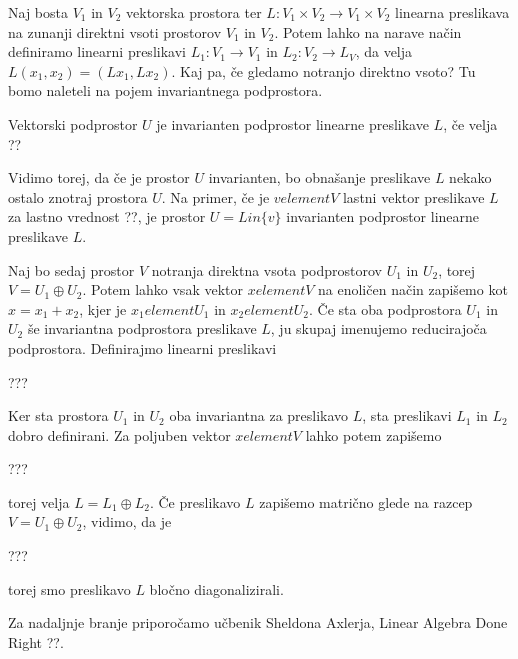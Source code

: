 \documentclass[a4paper]{article}
\begin{document}
Naj bosta $V_1$ in $V_2$ vektorska prostora ter $L \colon V_1 \times V_2 \to V_1 \times V_2$ linearna preslikava na zunanji direktni vsoti prostorov $V_1$ in $V_2$.
Potem lahko na narave način definiramo linearni preslikavi $L_1 \colon V_1 \to V_1$ in $L_2 \colon V_2 \to L_V$, da velja  
\(L(x_1, x_2) = (Lx_1, Lx_2).\)
Kaj pa, če gledamo notranjo direktno vsoto? Tu bomo naleteli na pojem invariantnega podprostora.

    Vektorski podprostor $U$ je invarianten podprostor linearne preslikave $L$, če velja 
    ??

Vidimo torej, da če je prostor $U$ invarianten, bo obnašanje preslikave $L$ nekako ostalo znotraj prostora $U$.
Na primer, če je $v element V$ lastni vektor preslikave $L$ za lastno vrednost ??, je prostor 
\(U = Lin \{ v \}\) invarianten podprostor linearne preslikave $L$.


Naj bo sedaj prostor $V$ notranja direktna vsota podprostorov $U_1$ in $U_2$, torej $V = U_1 \oplus U_2$.
Potem lahko vsak vektor $x element V$ na enoličen način zapišemo kot $x = x_1 + x_2$, kjer je $x_1 element U_1$ in $x_2 element U_2$.
Če sta oba podprostora $U_1$ in $U_2$ še invariantna podprostora preslikave $L$, ju skupaj imenujemo reducirajoča podprostora.
Definirajmo linearni preslikavi 

???

Ker sta prostora $U_1$ in $U_2$ oba invariantna za preslikavo $L$, sta preslikavi $L_1$ in $L_2$ dobro definirani.
Za poljuben vektor $x element V$ lahko potem zapišemo 

???

torej velja $L = L_1 \oplus L_2$.
Če preslikavo $L$ zapišemo matrično glede na razcep $V = U_1 \oplus U_2$, vidimo, da je

???

torej smo preslikavo $L$ bločno diagonalizirali.

Za nadaljnje branje priporočamo učbenik Sheldona Axlerja, Linear Algebra Done Right ??.
\end{document}
